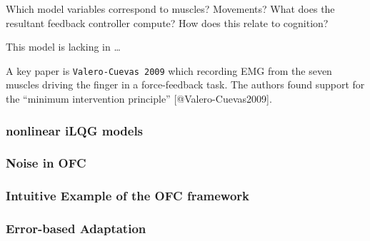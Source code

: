 \documentclass[../main.tex]{subfiles}
\begin{document}
Which model variables correspond to muscles? Movements? What does the
resultant feedback controller compute? How does this relate to
cognition?

This model is lacking in \ldots{}

A key paper is \texttt{Valero-Cuevas\ 2009} which recording EMG from the
seven muscles driving the finger in a force-feedback task. The authors
found support for the ``minimum intervention principle''
{[}@Valero-Cuevas2009{]}.

\subsubsection{nonlinear iLQG models}\label{nonlinear-ilqg-models}



\subsubsection{Noise in OFC}\label{noise-in-ofc}


\subsubsection{Intuitive Example of the OFC framework}\label{intuitive-example-of-the-ofc-framework}





\subsubsection{Error-based Adaptation}\label{error-based-adaptation}
\end{document}
